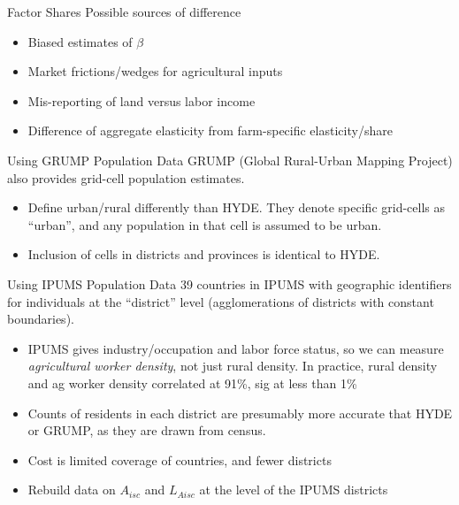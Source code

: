 \documentclass[10pt, xcolor=dvipsnames]{beamer}
\begin{document}
\begin{frame}{Factor Shares}
Possible sources of difference
\begin{itemize}
  \item Biased estimates of $\beta$
  \item Market frictions/wedges for agricultural inputs
  \item Mis-reporting of land versus labor income
  \item Difference of aggregate elasticity from farm-specific elasticity/share
\end{itemize}

\hfill \hyperlink{robustness}{}
\end{frame}

\begin{frame}{Using GRUMP Population Data}\label{grump}
GRUMP (Global Rural-Urban Mapping Project) also provides grid-cell population estimates. 
\begin{itemize}
  \item Define urban/rural differently than HYDE. They denote specific grid-cells as ``urban'', and any population in that cell is assumed to be urban.
  \item Inclusion of cells in districts and provinces is identical to HYDE. 
\end{itemize}

\end{frame}

\begin{frame}{Using IPUMS Population Data}\label{ipums}
39 countries in IPUMS with geographic identifiers for individuals at the ``district'' level (agglomerations of districts with constant boundaries). 
\begin{itemize}
  \item IPUMS gives industry/occupation and labor force status, so we can measure \textit{agricultural worker density}, not just rural density. In practice, rural density and ag worker density correlated at 91\%, sig at less than 1\%
  \item Counts of residents in each district are presumably more accurate that HYDE or GRUMP, as they are drawn from census. 
  \item Cost is limited coverage of countries, and fewer districts
  \item Rebuild data on $A_{isc}$ and $L_{Aisc}$ at the level of the IPUMS districts
\end{itemize}

\hfill \hyperlink{pop}{}
\end{frame}
\end{document}
